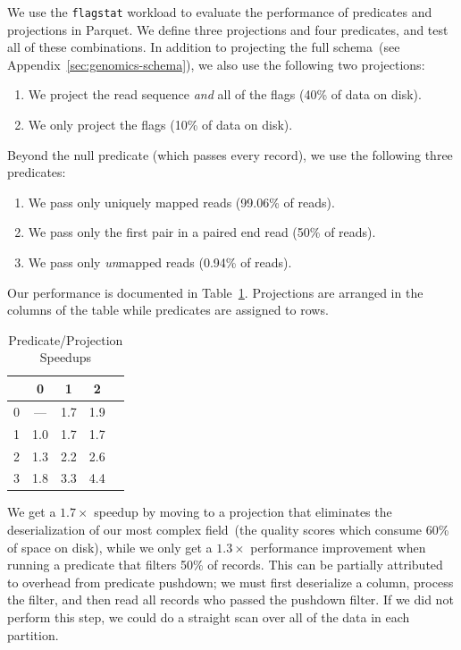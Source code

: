 \documentclass{acm_proc_article-sp}
\begin{document}
We use the \texttt{flagstat} workload to evaluate the performance of predicates and projections in Parquet.
We define three projections and four predicates, and test all of these combinations. In addition to projecting the
full schema~(see Appendix~\ref{sec:genomics-schema}), we also use the following two projections:

\begin{enumerate}
\item We project the read sequence \emph{and} all of the flags (40\% of data on disk).
\item We only project the flags (10\% of data on disk).
\end{enumerate}

Beyond the null predicate (which passes every record), we use the following three predicates:

\begin{enumerate}
\item We pass only uniquely mapped reads (99.06\% of reads).
\item We pass only the first pair in a paired end read (50\% of reads).
\item We pass only \emph{un}mapped reads (0.94\% of reads).
\end{enumerate}

Our performance is documented in Table~\ref{tab:ppp}. Projections are arranged in the columns of the table
while predicates are assigned to rows.

\begin{table}[h]
\caption{Predicate/Projection Speedups}
\label{tab:ppp}
\begin{center}
\begin{tabular}{ l | c c c c }
\hline
& 0 & 1 & 2 \\
\hline
\hline
0 & --- & 1.7 & 1.9 \\
1 & 1.0 & 1.7 & 1.7 \\
2 & 1.3 & 2.2 & 2.6 \\
3 & 1.8 & 3.3 & 4.4 \\
\hline
\end{tabular}
\end{center}
\end{table}

We get a $1.7\times$ speedup by moving to a projection that eliminates the deserialization of our most
complex field~(the quality scores which consume 60\% of space on disk), while we only get a $1.3\times$
performance improvement when running a predicate that filters 50\% of records. This can be partially attributed
to overhead from predicate pushdown; we must first deserialize a column, process the filter, and then read all
records who passed the pushdown filter. If we did not perform this step, we could do a straight scan over all of
the data in each partition.
\end{document}
